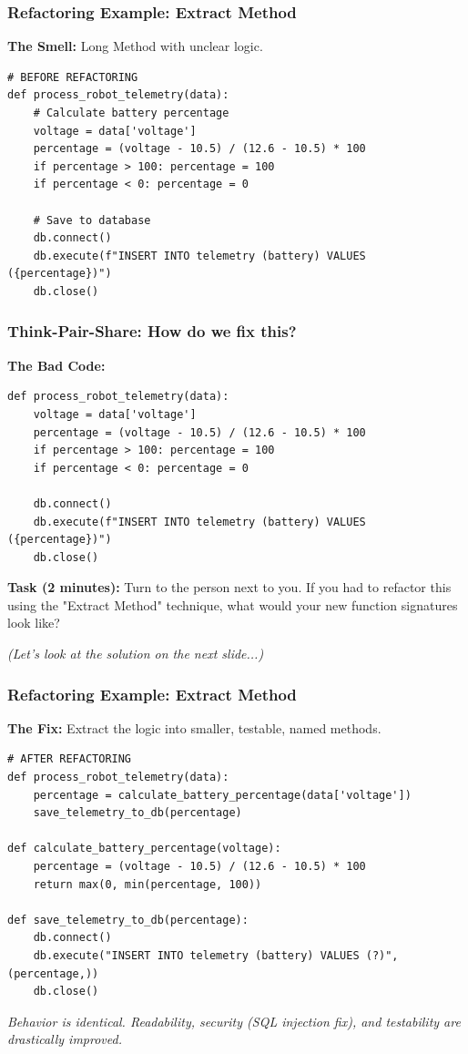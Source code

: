 \documentclass[xcolor=table]{beamer}
\begin{document}
\begin{frame}[fragile]
    \frametitle{Refactoring Example: Extract Method}
    \textbf{The Smell:} Long Method with unclear logic.
    
    \begin{verbatim}
# BEFORE REFACTORING
def process_robot_telemetry(data):
    # Calculate battery percentage
    voltage = data['voltage']
    percentage = (voltage - 10.5) / (12.6 - 10.5) * 100
    if percentage > 100: percentage = 100
    if percentage < 0: percentage = 0
    
    # Save to database
    db.connect()
    db.execute(f"INSERT INTO telemetry (battery) VALUES ({percentage})")
    db.close()
    \end{verbatim}
\end{frame}


\begin{frame}[fragile]
    \frametitle{Think-Pair-Share: How do we fix this?}
    \textbf{The Bad Code:}
    \begin{verbatim}
def process_robot_telemetry(data):
    voltage = data['voltage']
    percentage = (voltage - 10.5) / (12.6 - 10.5) * 100
    if percentage > 100: percentage = 100
    if percentage < 0: percentage = 0
    
    db.connect()
    db.execute(f"INSERT INTO telemetry (battery) VALUES ({percentage})")
    db.close()
    \end{verbatim}
    
    \vspace{0.3cm}
    \textbf{Task (2 minutes):} Turn to the person next to you. If you had to refactor this using the "Extract Method" technique, what would your new function signatures look like?
    
    \pause
    \vspace{0.2cm}
    \textit{(Let's look at the solution on the next slide...)}
\end{frame}

\begin{frame}[fragile]
    \frametitle{Refactoring Example: Extract Method}
    \textbf{The Fix:} Extract the logic into smaller, testable, named methods.
    
    \begin{verbatim}
# AFTER REFACTORING
def process_robot_telemetry(data):
    percentage = calculate_battery_percentage(data['voltage'])
    save_telemetry_to_db(percentage)

def calculate_battery_percentage(voltage):
    percentage = (voltage - 10.5) / (12.6 - 10.5) * 100
    return max(0, min(percentage, 100))

def save_telemetry_to_db(percentage):
    db.connect()
    db.execute("INSERT INTO telemetry (battery) VALUES (?)", (percentage,))
    db.close()
    \end{verbatim}
    \vspace{0.1cm}
    \textit{Behavior is identical. Readability, security (SQL injection fix), and testability are drastically improved.}
\end{frame}
\end{document}
